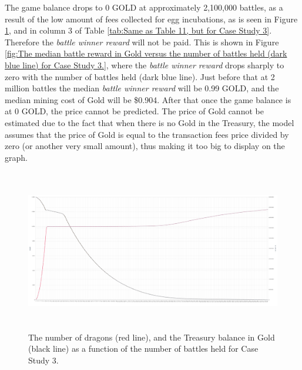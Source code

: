 \documentclass[12pt]{article}
\begin{document}
{The game balance drops to 0 GOLD at approximately 2,100,000 battles, as a result of the low amount of fees collected for egg incubations, as is seen in Figure \ref{fig:The number of dragons (red line), and the Treasury balance in Gold (black line) as a function of the number of battles held for Case Study 3.}}, and in column 3 of  Table \ref{tab:Same as Table 11, but for Case Study 3}. Therefore the \textit{battle winner reward} will not be paid. This is shown in Figure \ref{fig:The median battle reward in Gold versus the number of battles held (dark blue line) for Case Study 3.}, where the {\it battle winner reward} drops sharply to zero with the number of battles held (dark blue line). Just before that at 2 million battles the median {\it battle winner reward} will be 0.99 GOLD, and the median mining cost of Gold will be \$0.904.  After that once the game balance is at 0 GOLD, the price cannot be predicted. The price of Gold cannot be estimated due to the fact that when there is no Gold in the Treasury, the model assumes that the price of Gold is equal to the transaction fees price divided by zero (or another very small amount), thus making it too big to display on the graph.\par




\begin{figure}[H]
	\begin{Center}
		\includegraphics[width=6.27in,height=2.78in]{./media/CS3nimage17.png}
		\caption{The number of dragons (red line), and the Treasury balance in Gold (black line) as a function of the number of battles held for Case Study 3.}
		\label{fig:The number of dragons (red line), and the Treasury balance in Gold (black line) as a function of the number of battles held for Case Study 3.}
	\end{Center}
\end{figure}
\end{document}
